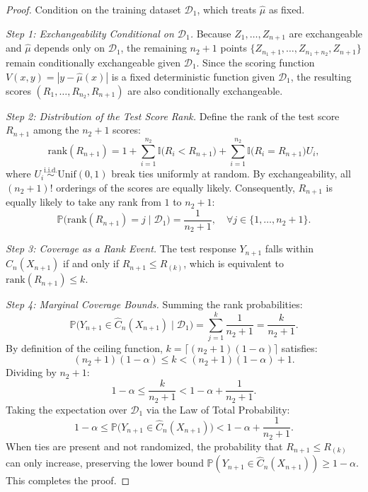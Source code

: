 \documentclass[journal]{IEEEtran}
\begin{document}
\begin{proof}
Condition on the training dataset $\mathcal{D}_1$, which treats $\hat{\mu}$ as fixed.

\textit{Step 1: Exchangeability Conditional on $\mathcal{D}_1$.}
Because $Z_1, \dots, Z_{n+1}$ are exchangeable and $\hat{\mu}$ depends only on $\mathcal{D}_1$, the remaining $n_2 + 1$ points $\{Z_{n_1+1}, \dots, Z_{n_1+n_2}, Z_{n+1}\}$ remain conditionally exchangeable given $\mathcal{D}_1$. Since the scoring function $V(x, y) = |y - \hat{\mu}(x)|$ is a fixed deterministic function given $\mathcal{D}_1$, the resulting scores $(R_1, \dots, R_{n_2}, R_{n+1})$ are also conditionally exchangeable.

\textit{Step 2: Distribution of the Test Score Rank.}
Define the rank of the test score $R_{n+1}$ among the $n_2 + 1$ scores:
\begin{equation}
\text{rank}(R_{n+1}) = 1 + \sum_{i=1}^{n_2} \mathbb{I}\big(R_i < R_{n+1}\big) + \sum_{i=1}^{n_2} \mathbb{I}\big(R_i = R_{n+1}\big) U_i,
\end{equation}
where $U_i \stackrel{\text{i.i.d.}}{\sim} \text{Unif}(0, 1)$ break ties uniformly at random. By exchangeability, all $(n_2 + 1)!$ orderings of the scores are equally likely. Consequently, $R_{n+1}$ is equally likely to take any rank from $1$ to $n_2 + 1$:
\begin{equation}
\mathbb{P}\big(\text{rank}(R_{n+1}) = j \mid \mathcal{D}_1\big) = \frac{1}{n_2 + 1}, \quad \forall j \in \{1, \dots, n_2 + 1\}.
\end{equation}

\textit{Step 3: Coverage as a Rank Event.}
The test response $Y_{n+1}$ falls within $\hat{C}_n(X_{n+1})$ if and only if $R_{n+1} \le R_{(k)}$, which is equivalent to $\text{rank}(R_{n+1}) \le k$.

\textit{Step 4: Marginal Coverage Bounds.}
Summing the rank probabilities:
\begin{equation}
\mathbb{P}\big(Y_{n+1} \in \hat{C}_n(X_{n+1}) \mid \mathcal{D}_1\big) = \sum_{j=1}^k \frac{1}{n_2 + 1} = \frac{k}{n_2 + 1}.
\end{equation}
By definition of the ceiling function, $k = \lceil (n_2 + 1)(1 - \alpha) \rceil$ satisfies:
\begin{equation}
(n_2 + 1)(1 - \alpha) \le k < (n_2 + 1)(1 - \alpha) + 1.
\end{equation}
Dividing by $n_2 + 1$:
\begin{equation}
1 - \alpha \le \frac{k}{n_2 + 1} < 1 - \alpha + \frac{1}{n_2 + 1}.
\end{equation}
Taking the expectation over $\mathcal{D}_1$ via the Law of Total Probability:
\begin{equation}
1 - \alpha \le \mathbb{P}\big(Y_{n+1} \in \hat{C}_n(X_{n+1})\big) < 1 - \alpha + \frac{1}{n_2 + 1}.
\end{equation}
When ties are present and not randomized, the probability that $R_{n+1} \le R_{(k)}$ can only increase, preserving the lower bound $\mathbb{P}(Y_{n+1} \in \hat{C}_n(X_{n+1})) \ge 1 - \alpha$. This completes the proof.
\end{proof}
\end{document}
